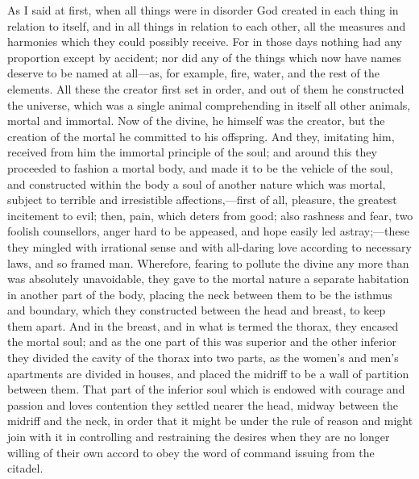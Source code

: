 \documentclass[11pt,letter]{article}
\begin{document}
\par  As I said at first, when all things were in disorder God created in each thing in relation to itself, and in all things in relation to each other, all the measures and harmonies which they could possibly receive. For in those days nothing had any proportion except by accident; nor did any of the things which now have names deserve to be named at all—as, for example, fire, water, and the rest of the elements. All these the creator first set in order, and out of them he constructed the universe, which was a single animal comprehending in itself all other animals, mortal and immortal. Now of the divine, he himself was the creator, but the creation of the mortal he committed to his offspring. And they, imitating him, received from him the immortal principle of the soul; and around this they proceeded to fashion a mortal body, and made it to be the vehicle of the soul, and constructed within the body a soul of another nature which was mortal, subject to terrible and irresistible affections,—first of all, pleasure, the greatest incitement to evil; then, pain, which deters from good; also rashness and fear, two foolish counsellors, anger hard to be appeased, and hope easily led astray;—these they mingled with irrational sense and with all-daring love according to necessary laws, and so framed man. Wherefore, fearing to pollute the divine any more than was absolutely unavoidable, they gave to the mortal nature a separate habitation in another part of the body, placing the neck between them to be the isthmus and boundary, which they constructed between the head and breast, to keep them apart. And in the breast, and in what is termed the thorax, they encased the mortal soul; and as the one part of this was superior and the other inferior they divided the cavity of the thorax into two parts, as the women’s and men’s apartments are divided in houses, and placed the midriff to be a wall of partition between them. That part of the inferior soul which is endowed with courage and passion and loves contention they settled nearer the head, midway between the midriff and the neck, in order that it might be under the rule of reason and might join with it in controlling and restraining the desires when they are no longer willing of their own accord to obey the word of command issuing from the citadel.
\end{document}
